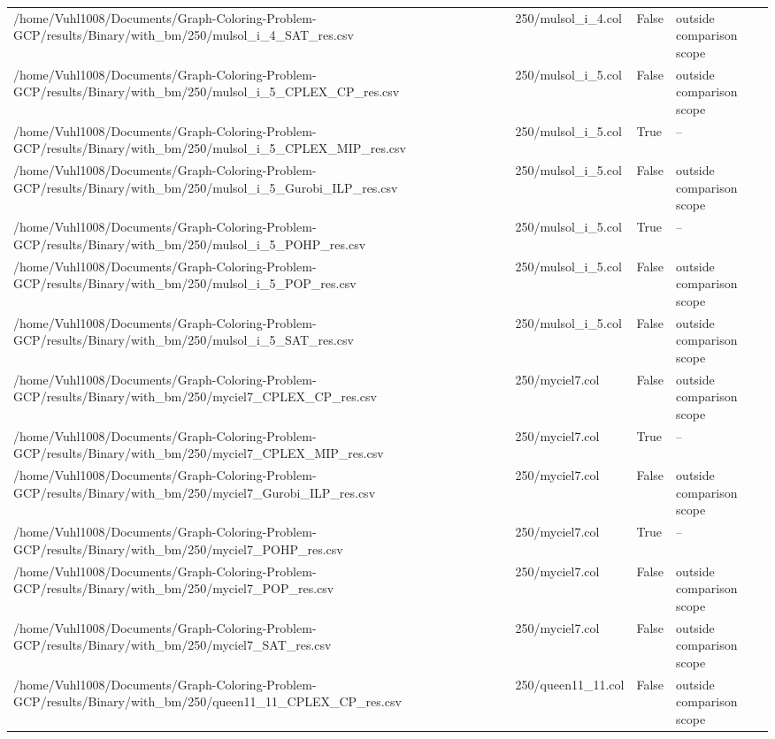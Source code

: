 \begin{table}[htbp]
\begin{tabular}{llll}
/home/Vuhl1008/Documents/Graph-Coloring-Problem-GCP/results/Binary/with\_bm/250/mulsol\_i\_4\_SAT\_res.csv & 250/mulsol\_i\_4.col & False & outside comparison scope \\
/home/Vuhl1008/Documents/Graph-Coloring-Problem-GCP/results/Binary/with\_bm/250/mulsol\_i\_5\_CPLEX\_CP\_res.csv & 250/mulsol\_i\_5.col & False & outside comparison scope \\
/home/Vuhl1008/Documents/Graph-Coloring-Problem-GCP/results/Binary/with\_bm/250/mulsol\_i\_5\_CPLEX\_MIP\_res.csv & 250/mulsol\_i\_5.col & True & -- \\
/home/Vuhl1008/Documents/Graph-Coloring-Problem-GCP/results/Binary/with\_bm/250/mulsol\_i\_5\_Gurobi\_ILP\_res.csv & 250/mulsol\_i\_5.col & False & outside comparison scope \\
/home/Vuhl1008/Documents/Graph-Coloring-Problem-GCP/results/Binary/with\_bm/250/mulsol\_i\_5\_POHP\_res.csv & 250/mulsol\_i\_5.col & True & -- \\
/home/Vuhl1008/Documents/Graph-Coloring-Problem-GCP/results/Binary/with\_bm/250/mulsol\_i\_5\_POP\_res.csv & 250/mulsol\_i\_5.col & False & outside comparison scope \\
/home/Vuhl1008/Documents/Graph-Coloring-Problem-GCP/results/Binary/with\_bm/250/mulsol\_i\_5\_SAT\_res.csv & 250/mulsol\_i\_5.col & False & outside comparison scope \\
/home/Vuhl1008/Documents/Graph-Coloring-Problem-GCP/results/Binary/with\_bm/250/myciel7\_CPLEX\_CP\_res.csv & 250/myciel7.col & False & outside comparison scope \\
/home/Vuhl1008/Documents/Graph-Coloring-Problem-GCP/results/Binary/with\_bm/250/myciel7\_CPLEX\_MIP\_res.csv & 250/myciel7.col & True & -- \\
/home/Vuhl1008/Documents/Graph-Coloring-Problem-GCP/results/Binary/with\_bm/250/myciel7\_Gurobi\_ILP\_res.csv & 250/myciel7.col & False & outside comparison scope \\
/home/Vuhl1008/Documents/Graph-Coloring-Problem-GCP/results/Binary/with\_bm/250/myciel7\_POHP\_res.csv & 250/myciel7.col & True & -- \\
/home/Vuhl1008/Documents/Graph-Coloring-Problem-GCP/results/Binary/with\_bm/250/myciel7\_POP\_res.csv & 250/myciel7.col & False & outside comparison scope \\
/home/Vuhl1008/Documents/Graph-Coloring-Problem-GCP/results/Binary/with\_bm/250/myciel7\_SAT\_res.csv & 250/myciel7.col & False & outside comparison scope \\
/home/Vuhl1008/Documents/Graph-Coloring-Problem-GCP/results/Binary/with\_bm/250/queen11\_11\_CPLEX\_CP\_res.csv & 250/queen11\_11.col & False & outside comparison scope \\

\end{tabular}
\end{table}
